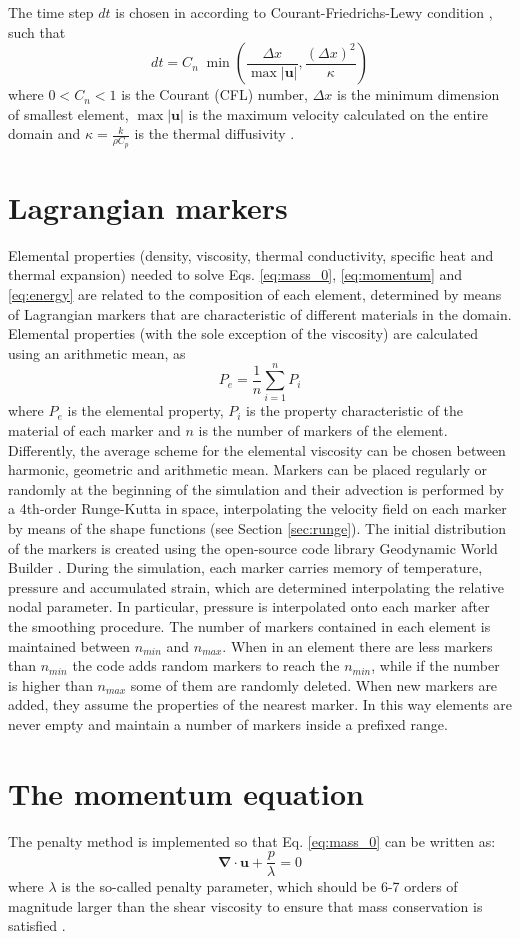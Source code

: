\documentclass[hidelinks,11pt,a4paper]{article}
\begin{document}
The time step $dt$ is chosen in according to Courant-Friedrichs-Lewy condition \citep{Anderson}, such that
\[dt=C_n\; \min\left(\frac{\Delta x}{\max|\bm{u}|},\frac{(\Delta x)^2}{\kappa}\right)\]
where $0<C_n<1$ is the Courant (CFL) number, $\Delta x$ is the minimum dimension of smallest element, $\max|\bm{u}|$ is the maximum velocity calculated on the entire domain and $\kappa=\frac{k}{\rho C_p}$ is the thermal diffusivity \citep{Thieulot2014}.

\section{Lagrangian markers}\label{sec:markers}
Elemental properties (density, viscosity, thermal conductivity, specific heat and thermal expansion) needed to solve Eqs. \ref{eq:mass_0}, \ref{eq:momentum} and \ref{eq:energy} are related to the composition of each element, determined by means of Lagrangian markers that are characteristic of different materials in the domain. Elemental properties (with the sole exception of the viscosity) are calculated using an arithmetic mean, as \[P_e=\frac{1}{n}\sum_{i=1}^n P_i\]
where $P_e$ is the elemental property, $P_i$ is the property characteristic of the material of each marker and $n$ is the number of markers of the element. Differently, the average scheme for the elemental viscosity can be chosen between harmonic, geometric and arithmetic mean. Markers can be placed regularly or randomly at the beginning of the simulation and their advection is performed by a 4th-order Runge-Kutta in space, interpolating the velocity field on each marker by means of the shape functions (see Section \ref{sec:runge}). The initial distribution of the markers is created using the open-source code library Geodynamic World Builder \citep{Fraters2019}. During the simulation, each marker carries memory of temperature, pressure and accumulated strain, which are determined interpolating the relative nodal parameter. In particular, pressure is interpolated onto each marker after the smoothing procedure. The number of markers contained in each element is maintained between $n_{min}$ and $n_{max}$. When in an element there are less markers than $n_{min}$ the code adds random markers to reach the $n_{min}$, while if the number is higher than $n_{max}$ some of them are randomly deleted. When new markers are added, they assume the properties of the nearest marker. In this way elements are never empty and maintain a number of markers inside a prefixed range.

\section{The momentum equation}\label{sec:mom_eq}
The penalty method is implemented so that Eq. \ref{eq:mass_0} can be written as:
\begin{equation}\label{eq:mass_penalty}
\bm{\nabla} \cdot \bm{u} + \frac{p}{\lambda}=0
\end{equation}
where $\lambda$ is the so-called penalty parameter, which should be 6-7 orders of magnitude larger than the shear viscosity to ensure that mass conservation is satisfied \citep{Donea2003,Thieulot2014}.
\end{document}
